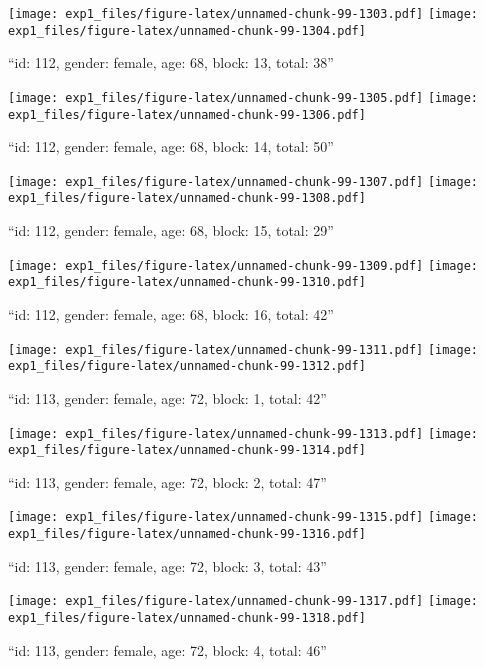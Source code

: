 \documentclass[,]{article}
\begin{document}
\texttt{[image: exp1\_files/figure-latex/unnamed-chunk-99-1303.pdf]}
\texttt{[image: exp1\_files/figure-latex/unnamed-chunk-99-1304.pdf]}

\newpage
[1] 

``id: 112, gender: female, age: 68, block: 13, total: 38''

\texttt{[image: exp1\_files/figure-latex/unnamed-chunk-99-1305.pdf]}
\texttt{[image: exp1\_files/figure-latex/unnamed-chunk-99-1306.pdf]}

\newpage
[1] 

``id: 112, gender: female, age: 68, block: 14, total: 50''

\texttt{[image: exp1\_files/figure-latex/unnamed-chunk-99-1307.pdf]}
\texttt{[image: exp1\_files/figure-latex/unnamed-chunk-99-1308.pdf]}

\newpage
[1] 

``id: 112, gender: female, age: 68, block: 15, total: 29''

\texttt{[image: exp1\_files/figure-latex/unnamed-chunk-99-1309.pdf]}
\texttt{[image: exp1\_files/figure-latex/unnamed-chunk-99-1310.pdf]}

\newpage
[1] 

``id: 112, gender: female, age: 68, block: 16, total: 42''

\texttt{[image: exp1\_files/figure-latex/unnamed-chunk-99-1311.pdf]}
\texttt{[image: exp1\_files/figure-latex/unnamed-chunk-99-1312.pdf]}

\newpage
[1] 

``id: 113, gender: female, age: 72, block: 1, total: 42''

\texttt{[image: exp1\_files/figure-latex/unnamed-chunk-99-1313.pdf]}
\texttt{[image: exp1\_files/figure-latex/unnamed-chunk-99-1314.pdf]}

\newpage
[1] 

``id: 113, gender: female, age: 72, block: 2, total: 47''

\texttt{[image: exp1\_files/figure-latex/unnamed-chunk-99-1315.pdf]}
\texttt{[image: exp1\_files/figure-latex/unnamed-chunk-99-1316.pdf]}

\newpage
[1] 

``id: 113, gender: female, age: 72, block: 3, total: 43''

\texttt{[image: exp1\_files/figure-latex/unnamed-chunk-99-1317.pdf]}
\texttt{[image: exp1\_files/figure-latex/unnamed-chunk-99-1318.pdf]}

\newpage
[1] 

``id: 113, gender: female, age: 72, block: 4, total: 46''
\end{document}
